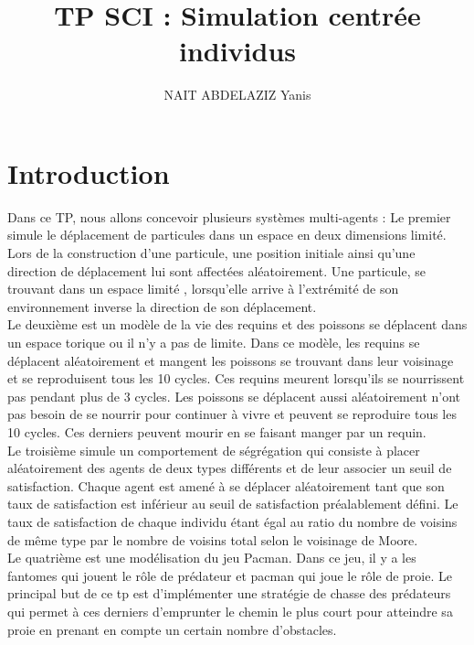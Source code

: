 \documentclass[a4paper,12pt]{report}
\title{TP SCI : Simulation centrée individus}
\author{NAIT ABDELAZIZ Yanis}
\begin{document}
\maketitle
\section*{Introduction}
Dans ce TP, nous allons concevoir plusieurs systèmes multi-agents :
	Le premier simule le déplacement de particules dans un espace en deux dimensions limité. Lors de la construction d'une particule, une position initiale ainsi qu'une direction de déplacement lui sont affectées aléatoirement. Une particule, se trouvant dans un espace limité , lorsqu'elle arrive à l’extrémité de son environnement inverse la direction de son déplacement.\\
	\indent Le deuxième est un modèle de la vie des requins et des poissons se déplacent dans un espace torique ou il n'y a pas de limite. Dans ce modèle, les requins se déplacent aléatoirement et mangent les poissons se trouvant dans leur voisinage et se reproduisent tous les 10 cycles. Ces requins meurent lorsqu'ils se nourrissent pas pendant plus de 3 cycles. Les poissons se déplacent aussi aléatoirement n'ont pas besoin de se nourrir pour continuer à vivre et peuvent se reproduire tous les 10 cycles. Ces derniers peuvent mourir en se faisant manger par un requin.\\
	\indent Le troisième simule un comportement de ségrégation qui consiste à placer aléatoirement des agents de deux types différents et de leur associer un seuil de satisfaction. Chaque agent est amené à se déplacer aléatoirement tant que son taux de satisfaction est inférieur au seuil de satisfaction préalablement défini. Le taux de satisfaction de chaque individu étant égal au ratio du nombre de voisins de même type par le nombre de voisins total selon le voisinage de Moore.\\
	\indent Le quatrième est une modélisation du jeu Pacman. Dans ce jeu, il y a les fantomes qui jouent le rôle de prédateur et pacman qui joue le rôle de proie. Le principal but de ce tp est d'implémenter une stratégie de chasse des prédateurs qui permet à ces derniers d'emprunter le chemin le plus court pour atteindre sa proie en prenant en compte un certain nombre d'obstacles.
\end{document}
